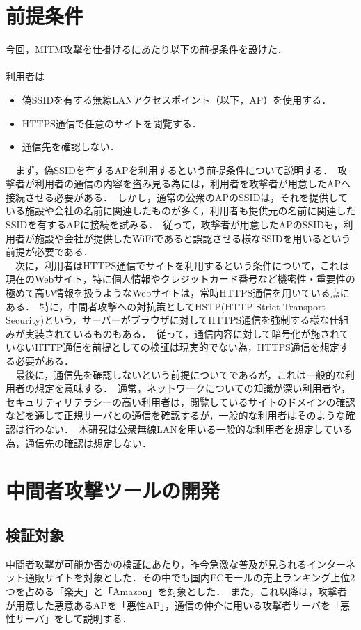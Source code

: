 \documentclass[dvipdfmx,twocolumn,9pt]{jsarticle}
\begin{document}
    \section{前提条件}
        今回，MITM攻撃を仕掛けるにあたり以下の前提条件を設けた．\\
        \\
        利用者は
        \begin{itemize}
            \item 偽SSIDを有する無線LANアクセスポイント（以下，AP）を使用する．
            \item HTTPS通信で任意のサイトを閲覧する．
            \item 通信先を確認しない．
        \end{itemize}
        　まず，偽SSIDを有するAPを利用するという前提条件について説明する．\
        攻撃者が利用者の通信の内容を盗み見る為には，利用者を攻撃者が用意したAPへ接続させる必要がある．\
        しかし，通常の公衆のAPのSSIDは，それを提供している施設や会社の名前に関連したものが多く，利用者も提供元の名前に関連したSSIDを有するAPに接続を試みる．\
        従って，攻撃者が用意したAPのSSIDも，利用者が施設や会社が提供したWiFiであると誤認させる様なSSIDを用いるという前提が必要である．\\
        　次に，利用者はHTTPS通信でサイトを利用するという条件について，これは現在のWebサイト，特に個人情報やクレジットカード番号など機密性・重要性の極めて高い情報を扱うようなWebサイトは，常時HTTPS通信を用いている点にある．\
        特に，中間者攻撃への対抗策としてHSTP(HTTP Strict Transport Security)という，サーバーがブラウザに対してHTTPS通信を強制する様な仕組みが実装されているものもある．\
        従って，通信内容に対して暗号化が施されていないHTTP通信を前提としての検証は現実的でない為，HTTPS通信を想定する必要がある．\\
        　最後に，通信先を確認しないという前提についてであるが，これは一般的な利用者の想定を意味する．\
        通常，ネットワークについての知識が深い利用者や，セキュリティリテラシーの高い利用者は，閲覧しているサイトのドメインの確認などを通して正規サーバとの通信を確認するが，一般的な利用者はそのような確認は行わない．\
        本研究は公衆無線LANを用いる一般的な利用者を想定している為，通信先の確認は想定しない．\\
    \section{中間者攻撃ツールの開発}
        \subsection{検証対象}
            中間者攻撃が可能か否かの検証にあたり，昨今急激な普及が見られるインターネット通販サイトを対象とした．その中でも国内ECモールの売上ランキング上位2つを占める「楽天」と「Amazon」を対象とした．\
            また，これ以降は，攻撃者が用意した悪意あるAPを「悪性AP」，通信の仲介に用いる攻撃者サーバを「悪性サーバ」をして説明する．
\end{document}
